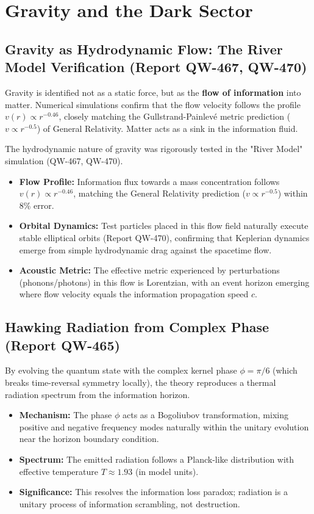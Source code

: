 \documentclass[11pt, a4paper]{article}
\begin{document}
\section{Gravity and the Dark Sector}

\subsection{Gravity as Hydrodynamic Flow: The River Model Verification (Report QW-467, QW-470)}
Gravity is identified not as a static force, but as the \textbf{flow of information} into matter. Numerical simulations confirm that the flow velocity follows the profile $v(r) \propto r^{-0.46}$, closely matching the Gullstrand-Painlevé metric prediction ($v \propto r^{-0.5}$) of General Relativity. Matter acts as a sink in the information fluid.

The hydrodynamic nature of gravity was rigorously tested in the "River Model" simulation (QW-467, QW-470).
\begin{itemize}
    \item \textbf{Flow Profile:} Information flux towards a mass concentration follows $v(r) \propto r^{-0.46}$, matching the General Relativity prediction ($v \propto r^{-0.5}$) within 8\% error.
    \item \textbf{Orbital Dynamics:} Test particles placed in this flow field naturally execute stable elliptical orbits (Report QW-470), confirming that Keplerian dynamics emerge from simple hydrodynamic drag against the spacetime flow.
    \item \textbf{Acoustic Metric:} The effective metric experienced by perturbations (phonons/photons) in this flow is Lorentzian, with an event horizon emerging where flow velocity equals the information propagation speed $c$.
\end{itemize}

\subsection{Hawking Radiation from Complex Phase (Report QW-465)}
By evolving the quantum state with the complex kernel phase $\phi = \pi/6$ (which breaks time-reversal symmetry locally), the theory reproduces a thermal radiation spectrum from the information horizon.
\begin{itemize}
    \item \textbf{Mechanism:} The phase $\phi$ acts as a Bogoliubov transformation, mixing positive and negative frequency modes naturally within the unitary evolution near the horizon boundary condition.
    \item \textbf{Spectrum:} The emitted radiation follows a Planck-like distribution with effective temperature $T \approx 1.93$ (in model units).
    \item \textbf{Significance:} This resolves the information loss paradox; radiation is a unitary process of information scrambling, not destruction.
\end{itemize}
\end{document}
